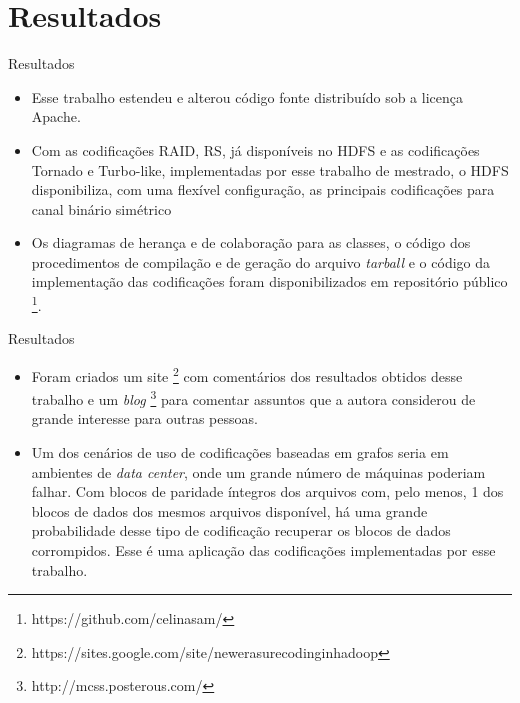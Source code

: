 \section{Resultados}

\begin{frame}{Resultados}

   \begin{itemize}

      \item Esse trabalho estendeu e alterou código fonte distribuído sob a licença Apache. 

      \item Com as codificações RAID, RS, já disponíveis no HDFS e as codificações Tornado e Turbo-like, implementadas por esse trabalho de mestrado, o HDFS disponibiliza, com uma flexível configuração, as principais codificações para canal binário simétrico

      \item Os diagramas de herança e de colaboração para as classes, o código dos procedimentos de compilação e de geração do arquivo \emph{tarball} e o código da implementação das codificações foram disponibilizados em repositório público \footnote{https://github.com/celinasam/}.

  \end{itemize}

\end{frame}

\begin{frame}{Resultados}

   \begin{itemize}

      \item Foram criados um site \footnote{https://sites.google.com/site/newerasurecodinginhadoop} com comentários dos resultados obtidos desse trabalho e um \emph{blog} \footnote{http://mcss.posterous.com/} para comentar assuntos que a autora considerou de grande interesse para outras pessoas.

      \item Um dos cenários de uso de codificações baseadas em grafos seria em ambientes de \emph{data center}, onde um grande número de máquinas poderiam falhar. Com blocos de paridade íntegros dos arquivos com, pelo menos, 1 dos blocos de dados dos mesmos arquivos disponível, há uma grande probabilidade desse tipo de codificação recuperar os blocos de dados corrompidos. Esse é uma aplicação das codificações implementadas por esse trabalho.
  \end{itemize}

\end{frame}

